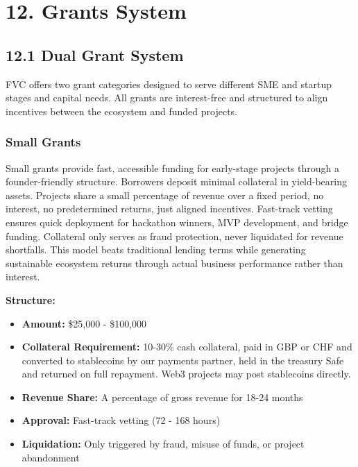 \documentclass[
  paper=a4,
  ,captions=tableheading
]{scrartcl}
\providecommand{\tightlist}{%
  \setlength{\itemsep}{0pt}\setlength{\parskip}{0pt}}
\begin{document}
\section{12. Grants System}\label{grants-system}

\subsection{12.1 Dual Grant System}\label{dual-grant-system}

FVC offers two grant categories designed to serve different
SME and startup stages and capital needs.
All grants are interest-free and structured to align incentives between
the ecosystem and funded projects.

\subsubsection{Small Grants}\label{small-grants}

Small grants provide fast, accessible funding for early-stage projects
through a founder-friendly structure. Borrowers deposit minimal
collateral in yield-bearing assets. Projects share a small percentage of
revenue over a fixed period, no interest, no predetermined returns,
just aligned incentives. Fast-track vetting ensures quick deployment for
hackathon winners, MVP development, and bridge funding. Collateral only
serves as fraud protection, never liquidated for revenue shortfalls.
This model beats traditional lending terms while generating sustainable
ecosystem returns through actual business performance rather than
interest.

\textbf{Structure:}

\begin{itemize}
\tightlist
\item
  \textbf{Amount:} \$25,000 - \$100,000
\item
  \textbf{Collateral Requirement:} 10-30\% cash collateral, paid in GBP
  or CHF and converted to stablecoins by our payments partner, held in the
  treasury Safe and returned on full repayment. Web3 projects may post
  stablecoins directly.
\item
  \textbf{Revenue Share:} A percentage of gross revenue for 18-24 months
\item
  \textbf{Approval:} Fast-track vetting (72 - 168 hours)
\item
  \textbf{Liquidation:} Only triggered by fraud, misuse of funds, or
  project abandonment
\end{itemize}
\end{document}
